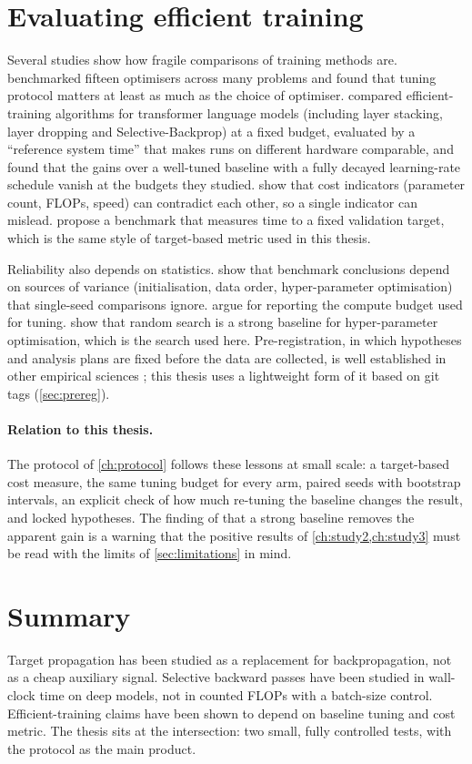 \section{Evaluating efficient training}\label{sec:related-eval}
Several studies show how fragile comparisons of training methods are. \citet{schmidt2021crowded} benchmarked fifteen optimisers across many problems and found that tuning protocol matters at least as much as the choice of optimiser. \citet{kaddour2023notrain} compared efficient-training algorithms for transformer language models (including layer stacking, layer dropping and Selective-Backprop) at a fixed budget, evaluated by a ``reference system time'' that makes runs on different hardware comparable, and found that the gains over a well-tuned baseline with a fully decayed learning-rate schedule vanish at the budgets they studied. \citet{dehghani2022efficiency} show that cost indicators (parameter count, FLOPs, speed) can contradict each other, so a single indicator can mislead. \citet{dahl2023benchmarking} propose a benchmark that measures time to a fixed validation target, which is the same style of target-based metric used in this thesis.

Reliability also depends on statistics. \citet{bouthillier2021accounting} show that benchmark conclusions depend on sources of variance (initialisation, data order, hyper-parameter optimisation) that single-seed comparisons ignore. \citet{dodge2019show} argue for reporting the compute budget used for tuning. \citet{bergstra2012random} show that random search is a strong baseline for hyper-parameter optimisation, which is the search used here. Pre-registration, in which hypotheses and analysis plans are fixed before the data are collected, is well established in other empirical sciences \citep{nosek2018preregistration}; this thesis uses a lightweight form of it based on git tags (\cref{sec:prereg}).

\paragraph{Relation to this thesis.} The protocol of \cref{ch:protocol} follows these lessons at small scale: a target-based cost measure, the same tuning budget for every arm, paired seeds with bootstrap intervals, an explicit check of how much re-tuning the baseline changes the result, and locked hypotheses. The finding of \citet{kaddour2023notrain} that a strong baseline removes the apparent gain is a warning that the positive results of \cref{ch:study2,ch:study3} must be read with the limits of \cref{sec:limitations} in mind.

\section{Summary}
Target propagation has been studied as a replacement for backpropagation, not as a cheap auxiliary signal. Selective backward passes have been studied in wall-clock time on deep models, not in counted FLOPs with a batch-size control. Efficient-training claims have been shown to depend on baseline tuning and cost metric. The thesis sits at the intersection: two small, fully controlled tests, with the protocol as the main product.
